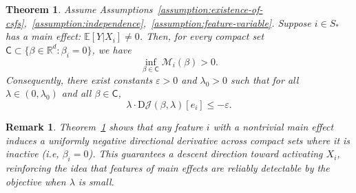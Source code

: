 \documentclass[sn-mathphys-num]{sn-jnl}%
\numberwithin{equation}{section}
\newcommand{\R}{\mathbb{R}}
\newcommand{\E}{\mathbb{E}}
\theoremstyle{thmstyleone}%
\newtheorem{theorem}{Theorem}%
\theoremstyle{thmstyletwo}%
\newtheorem{remark}{Remark}%
\theoremstyle{thmstylethree}%
\begin{document}
\begin{theorem}
\label{theorem:uniform-lower-bound-on-M-i-beta}
Assume Assumptions~\ref{assumption:existence-of-csfs},~\ref{assumption:independence},~\ref{assumption:feature-variable}. Suppose $i \in S_*$ has a main effect: $\E[Y|X_i] \ne 0$. Then, for every compact set $\mathsf{C} \subset \{\beta \in \R^d : \beta_i = 0\}$, we have
	\begin{equation*}
		\inf_{\beta \in \mathsf{C}} \mathcal{M}_i(\beta) > 0.
	\end{equation*}
Consequently, there exist constants $\varepsilon > 0$ and $\lambda_0 > 0$ such that for all $\lambda \in (0, \lambda_0)$ and all $\beta \in \mathsf{C}$,
\begin{equation*}
	\lambda \cdot \mathrm{D}\mathcal{J}(\beta, \lambda)[e_i] \le -\varepsilon.
\end{equation*}
\end{theorem}

\begin{remark}
\emph{
Theorem~\ref{theorem:uniform-lower-bound-on-M-i-beta} shows that any feature $i$ with a nontrivial main effect induces a uniformly negative directional derivative across compact sets where it is inactive (i.e, $\beta_i = 0$). This guarantees a descent direction toward activating $X_i$, reinforcing the idea that features of main effects are reliably detectable by the objective when $\lambda$ is small.
}
\end{remark}
\end{document}
